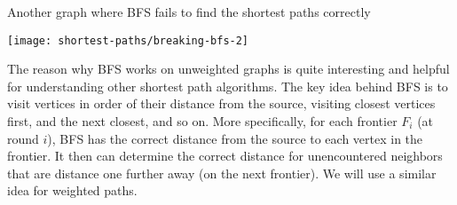 \begin{examplenotes}
Another graph where BFS fails to find the shortest paths correctly
%
\begin{center}
  \texttt{[image: shortest-paths/breaking-bfs-2]}
\end{center}
%
\end{examplenotes}

\begin{comment}
\begin{question}
Can you see why BFS works on graphs without edge weights?
\end{question}
\end{comment}

The reason why BFS works on unweighted graphs is quite interesting and
helpful for understanding other shortest path algorithms.  The key
idea behind BFS is to visit vertices in order of their distance from
the source, visiting closest vertices first, and the next closest, and
so on.  More specifically, for each frontier $F_i$ (at round $i$), BFS
has the correct distance from the source to each vertex in the
frontier.  It then can determine the correct distance for
unencountered neighbors that are distance one further away (on the
next frontier).  We will use a similar idea for weighted paths.

\begin{comment}
\begin{remark}
One way to think of BFS, especially when reasoning about shortest
paths, is to think of a ``gadget'' where each vertex is a bucket and
each edge is a pipe that connects the buckets. Imagine now pumping
water into the ``source'' bucket and watch the gadget flooded with
water.  The way water floods the system simulates how BFS discovers
the paths and vertices.  The flood waters reach a vertex through the
shortest path first, because they discover all paths simultaneously
arriving at each place at the earliest possible time.
\end{remark}
\end{comment}






